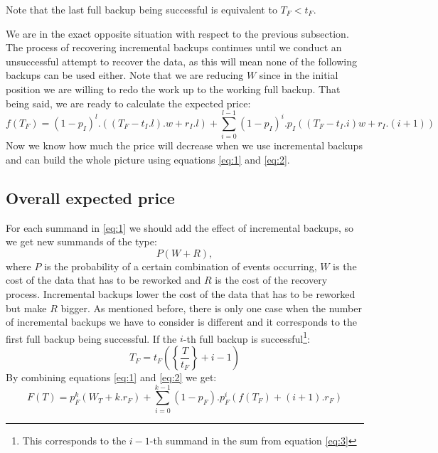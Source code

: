 \documentclass[11pt, a4paper]{article}
\theoremstyle{definition}
\begin{document}
		Note that the last full backup being successful is equivalent to $T_F<t_F$.\par
		We are in the exact opposite situation with respect to the previous subsection. The process of recovering incremental backups continues until we conduct an unsuccessful attempt to recover the data, as this will mean none of the following backups can be used either. Note that we are reducing $W$ since in the initial position we are willing to redo the work up to the working full backup. That being said, we are ready to calculate the expected price:
		\begin{equation}
		\label{eq:2}
			f(T_F) = (1-p_I)^l.((T_F-t_I.l).w + r_I.l) + \displaystyle \sum_{i=0}^{l-1} (1-p_I)^{i}.p_I((T_F-t_I.i)w + r_I.(i+1))
		\end{equation}
		Now we know how much the price will decrease when we use incremental backups and can build the whole picture using equations \ref{eq:1} and \ref{eq:2}.
		\subsection{Overall expected price}
		For each summand in \ref{eq:1} we should add the effect of incremental backups, so we get new summands of the type:
		$$
		P(W + R),
		$$
		where $P$ is the probability of a certain combination of events occurring, $W$ is the cost of the data that has to be reworked and $R$ is the cost of the recovery process. Incremental backups lower the cost of the data that has to be reworked but make $R$ bigger. As mentioned before, there is only one case when the number of incremental backups we have to consider is different and it corresponds to the first full backup being successful. If the $i$-th full backup is successful\footnote{This corresponds to the $i-1$-th summand in the sum from equation \ref{eq:3}}:
		$$
		T_F=t_F\left(\left\{ \frac{T}{t_F} \right\} + i - 1\right)
		$$
		By combining equations \ref{eq:1} and \ref{eq:2} we get:
		\begin{equation}\label{eq:3}
			F(T) = p_F^{k}(W_T+k.r_F) + \displaystyle\sum_{i=0}^{k-1}(1-p_F).p_F^{i}\left(f(T_F) + (i+1).r_F\right)
		\end{equation}
\end{document}
